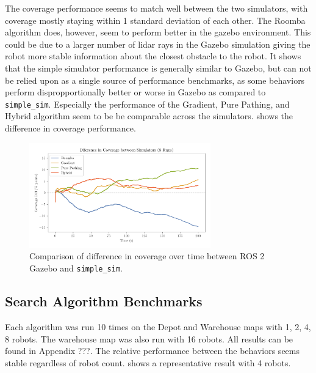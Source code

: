 The coverage performance seems to match well between the two simulators, with coverage mostly staying within 1 standard deviation of each other. The Roomba algorithm does, however, seem to perform better in the gazebo environment. This could be due to a larger number of lidar rays in the Gazebo simulation giving the robot more stable information about the closest obstacle to the robot. It shows that the simple simulator performance is generally similar to Gazebo, but can not be relied upon as a single source of performance benchmarks, as some behaviors perform dispropportionally better or worse in Gazebo as compared to \texttt{simple\_sim}. Especially the performance of the Gradient, Pure Pathing, and Hybrid algorithm seem to be be comparable across the simulators.  shows the difference in coverage performance.

\begin{figure}[H]
    \begin{center}
        \includegraphics[width=0.70\textwidth]{./figures/plots/consistency/sim_coverage_diff.png}
    \end{center}
    \caption{Comparison of difference in coverage over time between ROS 2 Gazebo and \texttt{simple\_sim}.}
    \label{fig:coverage-benchmark-diff}
\end{figure}


\subsection{Search Algorithm Benchmarks}
Each algorithm was run 10 times on the Depot and Warehouse maps with 1, 2, 4, 8 robots. The warehouse map was also run with 16 robots. All results can be found in {\color{red} Appendix ???}. The relative performance between the behaviors seems stable regardless of robot count.  shows a representative result with 4 robots.

